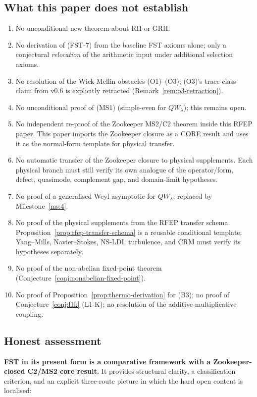 \documentclass[11pt,a4paper]{article}
\theoremstyle{plain}
\theoremstyle{definition}
\begin{document}
\subsection{What this paper does not establish}

\begin{enumerate}[leftmargin=*]
\item No unconditional new theorem about RH or GRH.
\item No derivation of (FST-7) from the baseline FST axioms alone;
  only a conjectural \emph{relocation} of the arithmetic input under
  additional selection axioms.
\item No resolution of the Wick-Mellin obstacles (O1)--(O3); (O3)'s
  trace-class claim from v0.6 is explicitly retracted
  (Remark~\ref{rem:o3-retraction}).
\item No unconditional proof of (MS1) (simple-even for $QW_\lambda$);
  this remains open.
\item No independent re-proof of the Zookeeper MS2/C2 theorem inside
  this RFEP paper.  This paper imports the Zookeeper closure as a
  CORE result and uses it as the normal-form template for physical
  transfer.
\item No automatic transfer of the Zookeeper closure to physical
  supplements.  Each physical branch must still verify its own
  analogue of the operator/form, defect, quasimode, complement gap,
  and domain-limit hypotheses.
\item No proof of a generalised Weyl asymptotic for $QW_\lambda$;
  replaced by Milestone~\ref{ms:4}.
\item No proof of the physical supplements from the RFEP transfer
  schema.  Proposition~\ref{prop:rfep-transfer-schema} is a reusable
  conditional template; Yang--Mills, Navier--Stokes, NS-LDI,
  turbulence, and CRM must verify its hypotheses separately.
\item No proof of the non-abelian fixed-point theorem
  (Conjecture~\ref{conj:nonabelian-fixed-point}).
\item No proof of Proposition~\ref{prop:thermo-derivation} for (B3);
  no proof of Conjecture~\ref{conj:l1k} (L1-K); no resolution of
  the additive-multiplicative coupling.
\end{enumerate}

\subsection{Honest assessment}

\textbf{FST in its present form is a comparative framework with a
Zookeeper-closed C2/MS2 core result.}  It provides structural clarity, a
classification criterion, and an explicit three-route picture in
which the hard open content is localised:
\end{document}
